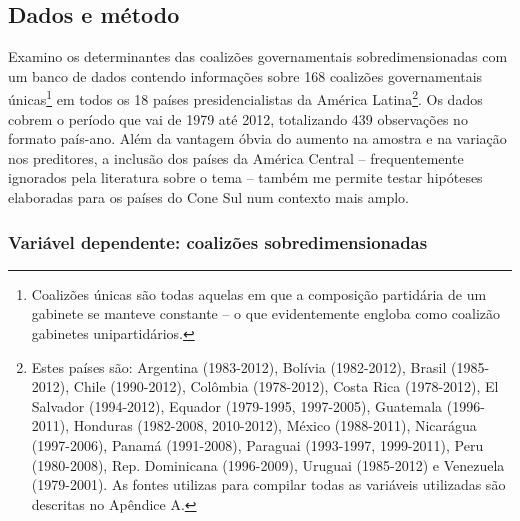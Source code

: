 \subsection{Dados e método}
\label{sec:dados}

Examino os determinantes das coalizões governamentais sobredimensionadas com um banco de dados contendo informações sobre 168 coalizões governamentais únicas\footnote{Coalizões únicas são todas aquelas em que a composição partidária de um gabinete se manteve constante -- o que evidentemente engloba como coalizão gabinetes unipartidários.} em todos os 18 países presidencialistas da América Latina\footnote{Estes países são: Argentina (1983-2012), Bolívia (1982-2012), Brasil (1985-2012), Chile (1990-2012), Colômbia (1978-2012), Costa Rica (1978-2012), El Salvador (1994-2012), Equador (1979-1995, 1997-2005), Guatemala (1996-2011), Honduras (1982-2008, 2010-2012), México (1988-2011), Nicarágua (1997-2006), Panamá (1991-2008), Paraguai (1993-1997, 1999-2011), Peru (1980-2008), Rep. Dominicana (1996-2009), Uruguai (1985-2012) e Venezuela (1979-2001). As fontes utilizas para compilar todas as variáveis utilizadas são descritas no Apêndice A.}. Os dados cobrem o período que vai de 1979 até 2012, totalizando 439 observações no formato país-ano. Além da vantagem óbvia do aumento na amostra e na variação nos preditores, a inclusão dos países da América Central -- frequentemente ignorados pela literatura sobre o tema -- também me permite testar hipóteses elaboradas para os países do Cone Sul num contexto mais amplo.

\subsubsection{Variável dependente: coalizões sobredimensionadas}

